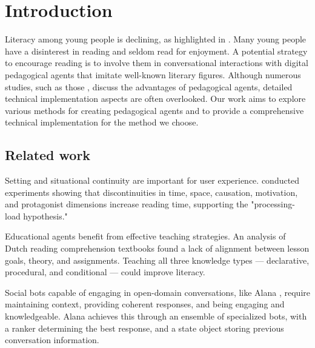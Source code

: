\documentclass[fleqn,moreauthors,10pt]{ds_report}
\affiliation{\textit{Advisors: Slavko Žitnik}}
\begin{document}
\flushbottom

\maketitle

\thispagestyle{empty}


\section*{Introduction}

Literacy among young people is declining, as highlighted in \cite{murray2021literacy}. Many young people have a disinterest in reading and seldom read for enjoyment. A potential strategy to encourage reading is to involve them in conversational interactions with digital pedagogical agents that imitate well-known literary figures. Although numerous studies, such as those \cite{nielen2018digital,alaimi2020pedagogical}, discuss the advantages of pedagogical agents, detailed technical implementation aspects are often overlooked. Our work aims to explore various methods for creating pedagogical agents and to provide a comprehensive technical implementation for the method we choose.

\subsection*{Related work}
Setting and situational continuity are important for user experience. \cite{situation_models} conducted experiments showing that discontinuities in time, space, causation, motivation, and protagonist dimensions increase reading time, supporting the "processing-load hypothesis."

Educational agents benefit from effective teaching strategies. An analysis of Dutch reading comprehension textbooks \cite{bogaerds2022textbooks} found a lack of alignment between lesson goals, theory, and assignments. Teaching all three knowledge types — declarative, procedural, and conditional — could improve literacy.

Social bots capable of engaging in open-domain conversations, like Alana \cite{papaioannou2022designing}, require maintaining context, providing coherent responses, and being engaging and knowledgeable. Alana achieves this through an ensemble of specialized bots, with a ranker determining the best response, and a state object storing previous conversation information.
\end{document}
